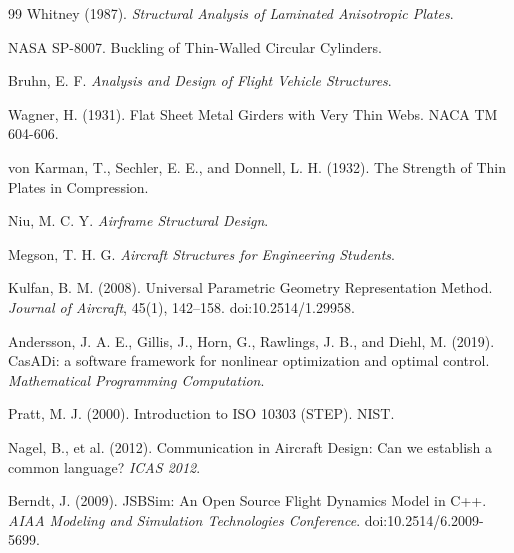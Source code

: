 \begin{thebibliography}{99}
Whitney (1987). \textit{Structural Analysis of Laminated Anisotropic Plates}.

NASA SP-8007. Buckling of Thin-Walled Circular Cylinders.

Bruhn, E. F. \textit{Analysis and Design of Flight Vehicle Structures}.

Wagner, H. (1931). Flat Sheet Metal Girders with Very Thin Webs. NACA TM 604-606.

von Karman, T., Sechler, E. E., and Donnell, L. H. (1932). The Strength of Thin Plates in Compression.

Niu, M. C. Y. \textit{Airframe Structural Design}.

Megson, T. H. G. \textit{Aircraft Structures for Engineering Students}.

Kulfan, B. M. (2008). Universal Parametric Geometry Representation Method. \textit{Journal of Aircraft}, 45(1), 142--158. doi:10.2514/1.29958.

Andersson, J. A. E., Gillis, J., Horn, G., Rawlings, J. B., and Diehl, M. (2019). CasADi: a software framework for nonlinear optimization and optimal control. \textit{Mathematical Programming Computation}.

Pratt, M. J. (2000). Introduction to ISO 10303 (STEP). NIST.

Nagel, B., et al. (2012). Communication in Aircraft Design: Can we establish a common language? \textit{ICAS 2012}.

Berndt, J. (2009). JSBSim: An Open Source Flight Dynamics Model in C++. \textit{AIAA Modeling and Simulation Technologies Conference}. doi:10.2514/6.2009-5699.

\end{thebibliography}
